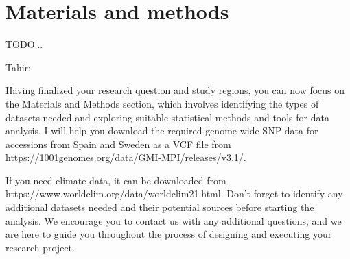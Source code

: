\section{Materials and methods}

TODO...

Tahir:

Having finalized your research question and study regions, you can now focus on the Materials and Methods section, which involves identifying the types of datasets needed and exploring suitable statistical methods and tools for data analysis. I will help you download the required genome-wide SNP data for accessions from Spain and Sweden as a VCF file from https://1001genomes.org/data/GMI-MPI/releases/v3.1/.

If you need climate data, it can be downloaded from https://www.worldclim.org/data/worldclim21.html. Don’t forget to identify any additional datasets needed and their potential sources before starting the analysis. We encourage you to contact us with any additional questions, and we are here to guide you throughout the process of designing and executing your research project.